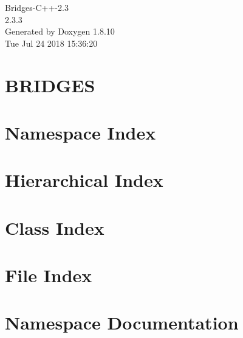\documentclass[twoside]{book}
\newcommand{\+}{\discretionary{\mbox{\scriptsize$\hookleftarrow$}}{}{}}
\newcommand{\clearemptydoublepage}{%
  \newpage{\pagestyle{empty}\cleardoublepage}%
}
\begin{document}
\hypersetup{pageanchor=false,
             bookmarks=true,
             bookmarksnumbered=true,
             pdfencoding=unicode
            }
\begin{titlepage}
\vspace*{7cm}
\begin{center}%
{\Large Bridges-\/\+C++-\/2.3 \\[1ex]\large 2.\+3.\+3 }\\
\vspace*{1cm}
{\large Generated by Doxygen 1.8.10}\\
\vspace*{0.5cm}
{\small Tue Jul 24 2018 15:36:20}\\
\end{center}
\end{titlepage}
\clearemptydoublepage
\tableofcontents
\clearemptydoublepage
{}
\hypersetup{pageanchor=true}

\chapter{B\+R\+I\+D\+G\+E\+S}
\label{index}\hypertarget{index}{}
\chapter{Namespace Index}

\chapter{Hierarchical Index}

\chapter{Class Index}

\chapter{File Index}

\chapter{Namespace Documentation}




\end{document}
